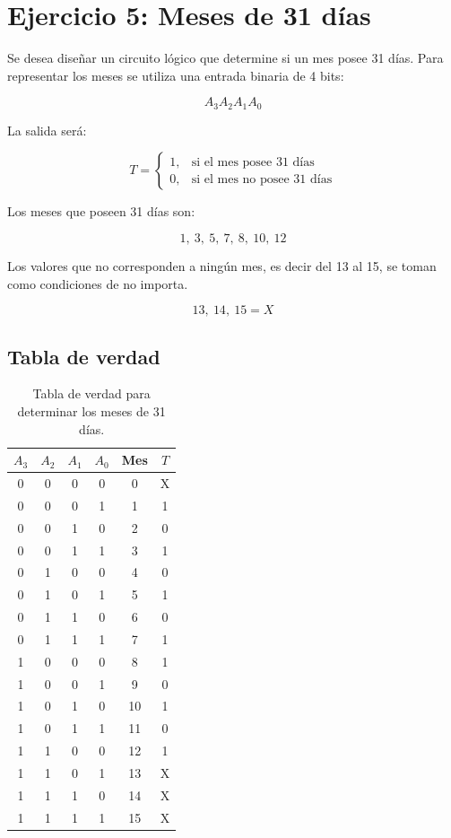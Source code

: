 \documentclass[a4paper,12pt]{article}
\begin{document}
	\section*{Ejercicio 5: Meses de 31 días}
	
	Se desea diseñar un circuito lógico que determine si un mes posee 31 días. 
	Para representar los meses se utiliza una entrada binaria de 4 bits:
	
	\[
	A_3A_2A_1A_0
	\]
	
	La salida será:
	
	\[
	T =
	\begin{cases}
		1, & \text{si el mes posee 31 días} \\
		0, & \text{si el mes no posee 31 días}
	\end{cases}
	\]
	
	Los meses que poseen 31 días son:
	
	\[
	1,\ 3,\ 5,\ 7,\ 8,\ 10,\ 12
	\]
	
	Los valores que no corresponden a ningún mes, es decir del 13 al 15, se toman como condiciones de no importa.
	
	\[
	13,\ 14,\ 15 = X
	\]
	
	\subsection*{Tabla de verdad}
	
	\begin{table}[h!]
		\centering
		\begin{tabular}{|c c c c|c|c|}
			\hline
			$A_3$ & $A_2$ & $A_1$ & $A_0$ & Mes & $T$ \\
			\hline
			0 & 0 & 0 & 0 & 0  & X \\
			0 & 0 & 0 & 1 & 1  & 1 \\
			0 & 0 & 1 & 0 & 2  & 0 \\
			0 & 0 & 1 & 1 & 3  & 1 \\
			0 & 1 & 0 & 0 & 4  & 0 \\
			0 & 1 & 0 & 1 & 5  & 1 \\
			0 & 1 & 1 & 0 & 6  & 0 \\
			0 & 1 & 1 & 1 & 7  & 1 \\
			1 & 0 & 0 & 0 & 8  & 1 \\
			1 & 0 & 0 & 1 & 9  & 0 \\
			1 & 0 & 1 & 0 & 10 & 1 \\
			1 & 0 & 1 & 1 & 11 & 0 \\
			1 & 1 & 0 & 0 & 12 & 1 \\
			1 & 1 & 0 & 1 & 13 & X \\
			1 & 1 & 1 & 0 & 14 & X \\
			1 & 1 & 1 & 1 & 15 & X \\
			\hline
		\end{tabular}
		\caption{Tabla de verdad para determinar los meses de 31 días.}
	\end{table}
	
\end{document}

